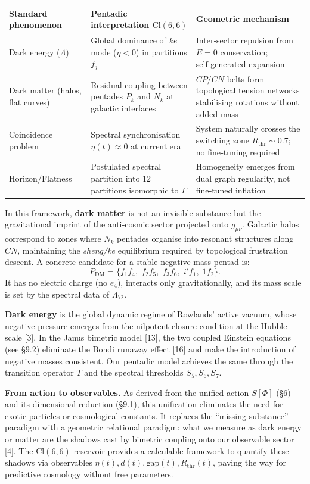 \documentclass[11pt]{article}
\begin{document}
\begin{table}[H]
\centering
\small
\begin{tabularx}{\textwidth}{@{}XXX@{}}
\toprule
Standard phenomenon & Pentadic interpretation $\text{Cl}(6,6)$ & Geometric mechanism \\
\midrule
Dark energy ($\Lambda$) & Global dominance of \textit{ke} mode ($\eta <0$) in partitions $f_j$ & Inter‑sector repulsion from $E=0$ conservation; self‑generated expansion \\
Dark matter (halos, flat curves) & Residual coupling between pentades $P_k$ and $N_k$ at galactic interfaces & $CP/CN$ belts form topological tension networks stabilising rotations without added mass \\
Coincidence problem & Spectral synchronisation $\eta(t) \approx 0$ at current era & System naturally crosses the switching zone $R_{\text{thr}} \sim 0.7$; no fine‑tuning required \\
Horizon/Flatness & Postulated spectral partition into 12 partitions isomorphic to $\Gamma$ & Homogeneity emerges from dual graph regularity, not fine‑tuned inflation \\
\bottomrule
\end{tabularx}
\end{table}

In this framework, \textbf{dark matter} is not an invisible substance
but the gravitational imprint of the anti‑cosmic sector projected onto
\(g_{\mu\nu}\). Galactic halos correspond to zones where \(N_k\)
pentades organise into resonant structures along \(CN\), maintaining the
\textit{sheng/ke} equilibrium required by topological frustration
descent. A concrete candidate for a stable negative‑mass pentad is: \[
P_{\text{DM}} = \{ f_1f_4,\; f_2f_5,\; f_3f_6,\; i'f_1,\; 1f_2 \}.
\] It has no electric charge (no \(e_4\)), interacts only
gravitationally, and its mass scale is set by the spectral data of
\(\Lambda_{72}\).

\textbf{Dark energy} is the global dynamic regime of Rowlands' active
vacuum, whose negative pressure emerges from the nilpotent closure
condition at the Hubble scale {[}3{]}. In the Janus bimetric model
{[}13{]}, the two coupled Einstein equations (see §9.2) eliminate the
Bondi runaway effect {[}16{]} and make the introduction of negative
masses consistent. Our pentadic model achieves the same through the
transition operator \(T\) and the spectral thresholds \(S_5,S_6,S_7\).

\textbf{From action to observables.} As derived from the unified action
\(S[\Phi]\) (§6) and its dimensional reduction (§9.1), this unification
eliminates the need for exotic particles or cosmological constants. It
replaces the ``missing substance'' paradigm with a geometric relational
paradigm: what we measure as dark energy or matter are the shadows cast
by bimetric coupling onto our observable sector {[}4{]}. The
\(\text{Cl}(6,6)\) reservoir provides a calculable framework to quantify
these shadows via observables
\(\eta(t), d(t), \text{gap}(t), R_{\text{thr}}(t)\), paving the way for
predictive cosmology without free parameters.
\end{document}
